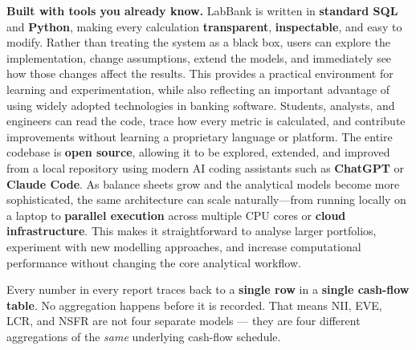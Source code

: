 \documentclass[11pt,a4paper]{article}
\begin{document}
\textbf{Built with tools you already know.}
LabBank is written in \textbf{standard SQL} and \textbf{Python}, making every calculation
\textbf{transparent}, \textbf{inspectable}, and easy to modify. Rather than treating the system
as a black box, users can explore the implementation, change assumptions, extend the models, and
immediately see how those changes affect the results. This provides a practical environment for
learning and experimentation, while also reflecting an important advantage of using widely adopted
technologies in banking software. Students, analysts, and engineers can read the code, trace how
every metric is calculated, and contribute improvements without learning a proprietary language
or platform. The entire codebase is \textbf{open source}, allowing it to be explored, extended,
and improved from a local repository using modern AI coding assistants such as
\textbf{ChatGPT} or \textbf{Claude Code}. As balance sheets grow and the analytical models become
more sophisticated, the same architecture can scale naturally---from running locally on a laptop
to \textbf{parallel execution} across multiple CPU cores or \textbf{cloud infrastructure}. This
makes it straightforward to analyse larger portfolios, experiment with new modelling approaches,
and increase computational performance without changing the core analytical workflow.

\begin{pitchbox}
Every number in every report traces back to a \textbf{single row} in a
\textbf{single cash-flow table}. No aggregation happens before it is recorded.
That means NII, EVE, LCR, and NSFR are not four separate models --- they are four
different aggregations of the \textit{same} underlying cash-flow schedule.
\end{pitchbox}
\end{document}
